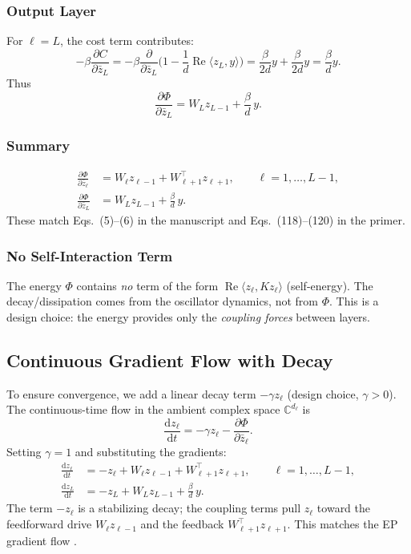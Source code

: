\documentclass[11pt]{article}
\newcommand{\C}{\mathbb{C}}
\newcommand{\dd}{\mathrm{d}}
\DeclareMathOperator{\Real}{Re}
\begin{document}
\subsubsection{Output Layer}
For $\ell = L$, the cost term contributes:
\begin{equation}
-\beta \frac{\partial C}{\partial \bar{z}_L}
= -\beta \frac{\partial}{\partial \bar{z}_L}\Big(1 - \frac{1}{d}\Real\langle z_L, y \rangle\Big)
= \frac{\beta}{2d} y + \frac{\beta}{2d} y
= \frac{\beta}{d} y.
\end{equation}
Thus
\begin{equation}\label{eq:grad-output}
\frac{\partial \Phi}{\partial \bar{z}_L} = W_L z_{L-1} + \frac{\beta}{d}\, y.
\end{equation}

\subsubsection{Summary}
\begin{align}
\frac{\partial \Phi}{\partial \bar{z}_\ell} &= W_\ell z_{\ell-1} + W_{\ell+1}^\top z_{\ell+1}, \qquad \ell = 1,\dots,L-1, \label{eq:grad-hidden-full}\\
\frac{\partial \Phi}{\partial \bar{z}_L} &= W_L z_{L-1} + \frac{\beta}{d}\, y. \label{eq:grad-output-full}
\end{align}
These match Eqs.~(5)--(6) in the manuscript and Eqs.~(118)--(120) in the primer.

\subsubsection{No Self-Interaction Term}
The energy $\Phi$ contains \emph{no} term of the form $\Real\langle z_\ell, K z_\ell \rangle$ (self-energy). The decay/dissipation comes from the oscillator dynamics, not from $\Phi$. This is a design choice: the energy provides only the \emph{coupling forces} between layers.

\subsection{Continuous Gradient Flow with Decay}

To ensure convergence, we add a linear decay term $-\gamma z_\ell$ (design choice, $\gamma > 0$). The continuous-time flow in the ambient complex space $\C^{d_\ell}$ is
\begin{equation}\label{eq:continuous-flow-full}
\frac{\dd z_\ell}{\dd t} = -\gamma z_\ell - \frac{\partial \Phi}{\partial \bar{z}_\ell}.
\end{equation}
Setting $\gamma = 1$ and substituting the gradients:
\begin{align}
\frac{\dd z_\ell}{\dd t} &= -z_\ell + W_\ell z_{\ell-1} + W_{\ell+1}^\top z_{\ell+1}, \qquad \ell = 1,\dots,L-1, \\
\frac{\dd z_L}{\dd t} &= -z_L + W_L z_{L-1} + \frac{\beta}{d}\, y.
\end{align}
The term $-z_\ell$ is a stabilizing decay; the coupling terms pull $z_\ell$ toward the feedforward drive $W_\ell z_{\ell-1}$ and the feedback $W_{\ell+1}^\top z_{\ell+1}$. This matches the EP gradient flow \citep{scellier2017equilibrium}.
\end{document}
